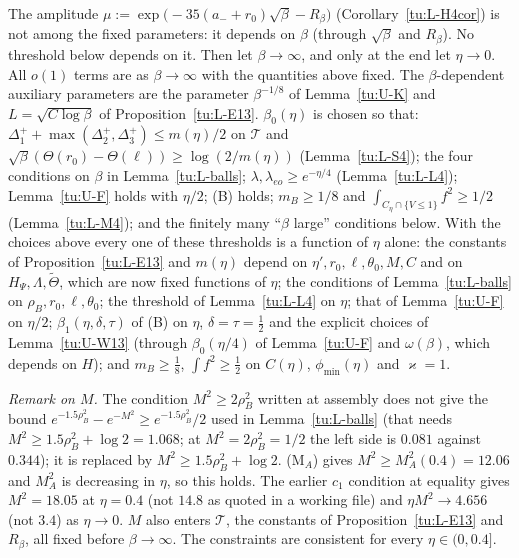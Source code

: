 The amplitude $\mu:=\exp\big(-35(a_-+r_0)\sqrt\beta-R_\beta\big)$ (Corollary~\ref{tu:L-H4cor}) is not among the fixed parameters:
it depends on $\beta$ (through $\sqrt\beta$ and $R_\beta$). No threshold below depends on it.
Then let $\beta\to\infty$, and only at the end let $\eta\to0$. All $o(1)$ terms are as $\beta\to\infty$ with the quantities above
fixed. The $\beta$-dependent auxiliary parameters are the parameter $\beta^{-1/8}$ of Lemma~\ref{tu:U-K} and $L=\sqrt{C\log\beta}$ of
Proposition~\ref{tu:L-E13}. $\beta_0(\eta)$ is chosen so that: $\Delta_1^++\max(\Delta_2^+,\Delta_3^+)\le m(\eta)/2$ on $\mathcal T$ and $\sqrt\beta(\Theta(r_0)-\Theta(\ell))\ge\log(2/m(\eta))$ (Lemma~\ref{tu:L-S4}); the four conditions on $\beta$ in Lemma~\ref{tu:L-balls};
$\lambda,\lambda_{eo}\ge e^{-\eta/4}$ (Lemma~\ref{tu:L-L4}); Lemma~\ref{tu:U-F} holds with $\eta/2$; (B) holds; $m_B\ge1/8$ and
$\int_{C_\eta\cap\{V\le1\}}f^2\ge1/2$ (Lemma~\ref{tu:L-M4}); and the finitely many ``$\beta$ large'' conditions below.
With the choices above every one of these thresholds is a function of $\eta$ alone: the constants of
Proposition~\ref{tu:L-E13} and $m(\eta)$ depend on $\eta',r_0,\ell,\theta_0,M,C$ and on $H_\Psi,\Lambda,\tilde\Theta$, which are now
fixed functions of $\eta$; the conditions of Lemma~\ref{tu:L-balls} on $\rho_B,r_0,\ell,\theta_0$; the threshold of
Lemma~\ref{tu:L-L4} on $\eta$; that of Lemma~\ref{tu:U-F} on $\eta/2$; $\beta_1(\eta,\delta,\tau)$ of (B) on $\eta$, $\delta=\tau=\frac12$ and
the explicit choices of Lemma~\ref{tu:U-W13} (through $\beta_0(\eta/4)$ of Lemma~\ref{tu:U-F} and $\omega(\beta)$, which depends on $H$);
and $m_B\ge\frac18$, $\int f^2\ge\frac12$ on $C(\eta)$, $\phi_{\min}(\eta)$ and $\varkappa=1$.

\noindent\emph{Remark on $M$.} The condition $M^2\ge2\rho_B^2$ written at assembly does not give the bound
$e^{-1.5\rho_B^2}-e^{-M^2}\ge e^{-1.5\rho_B^2}/2$ used in Lemma~\ref{tu:L-balls} (that needs $M^2\ge1.5\rho_B^2+\log2=1.068$; at $M^2=2\rho_B^2=1/2$
the left side is $0.081$ against $0.344$); it is replaced by $M^2\ge1.5\rho_B^2+\log2$. (M$_A$) gives $M^2\ge M_A^2(0.4)=12.06$ and
$M_A^2$ is decreasing in $\eta$, so this holds. The earlier $c_1$ condition at equality gives $M^2=18.05$ at $\eta=0.4$ (not $14.8$ as
quoted in a working file) and $\eta M^2\to4.656$ (not $3.4$) as $\eta\to0$. $M$ also enters $\mathcal T$, the constants of
Proposition~\ref{tu:L-E13} and $R_\beta$, all fixed before $\beta\to\infty$. The constraints are consistent for every $\eta\in(0,0.4]$.


